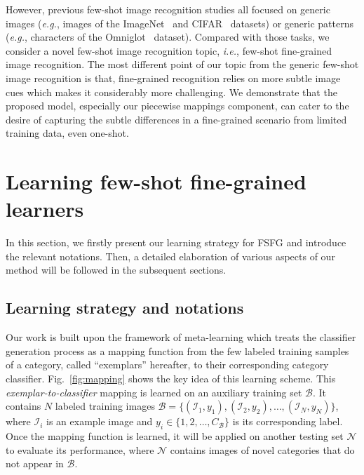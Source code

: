 \documentclass[10pt,twocolumn,letterpaper]{article}
\begin{document}
However, previous few-shot image recognition studies all focused on generic images (\emph{e.g.}, images of the ImageNet~\cite{ILSVRC15} and CIFAR~\cite{cifar} datasets) or generic patterns (\emph{e.g.}, characters of the Omniglot~\cite{cogsci2011} dataset). Compared with those tasks, we consider a novel few-shot image recognition topic, \emph{i.e.}, few-shot fine-grained image recognition. The most different point of our topic from the generic few-shot image recognition is that, fine-grained recognition relies on more subtle image cues which makes it considerably more challenging. We demonstrate that the proposed model, especially our piecewise mappings component, can cater to the desire of capturing the subtle differences in a fine-grained scenario from limited training data, even one-shot.

\section{Learning few-shot fine-grained learners}\label{sec:model}

In this section, we firstly present our learning strategy for FSFG and introduce the relevant notations. Then, a detailed elaboration of various aspects of our method will be followed in the subsequent sections. 

\subsection{Learning strategy and notations}

Our work is built upon the framework of meta-learning which treats the classifier generation process as a mapping function from the few labeled training samples of a category, called ``exemplars'' hereafter, to their corresponding category classifier. Fig.~\ref{fig:mapping} shows the key idea of this learning scheme. This \emph{exemplar-to-classifier} mapping is learned on an auxiliary training set $\mathcal{B}$. It contains $N$ labeled training images $\mathcal{B}=\{(\mathcal{I}_1,y_1),(\mathcal{I}_2,y_2),\ldots,(\mathcal{I}_N,y_N)\}$, where $\mathcal{I}_i$ is an example image and $y_i\in\{1,2,\ldots,C_{\mathcal{B}}\}$ is its corresponding label. Once the mapping function is learned, it will be applied on another testing set $\mathcal{N}$ to evaluate its performance, where $\mathcal{N}$ contains images of novel categories that do not appear in $\mathcal{B}$. 
\end{document}
